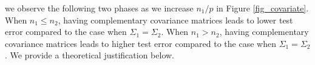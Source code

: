 we observe the following two phases as we increase $n_1 / p$ in Figure \ref{fig_covariate}.
When $n_1 \le n_2$, having complementary covariance matrices leads to lower test error compared to the case when $\Sigma_1 = \Sigma_2$.
When $n_1 > n_2$, having complementary covariance matrices leads to higher test error compared to the case when $\Sigma_1 = \Sigma_2$.
We provide a theoretical justification below.

